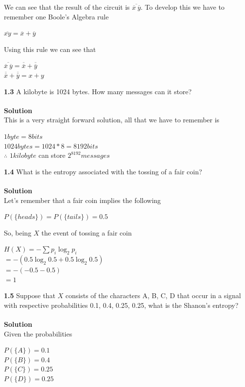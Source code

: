 \documentclass{article}
\begin{document}
We can see that the result of the circuit is $\overline{\overline{x} \ \overline{y}}$. To develop this we have to remember one Boole's Algebra rule
\begin{center}
$\overline{xy} = \overline{x} + \overline{y}$
\end{center}
Using this rule we can see that \\
\begin{center}
$\overline{\overline{x} \ \overline{y}} = \overline{\overline{x}} + \overline{\overline{y}}$\\
$\overline{\overline{x}} + \overline{\overline{y}} = x + y$
\end{center}
\textbf{1.3} A kilobyte is 1024 bytes. How many messages can it store?\\ \\
\textbf{Solution}\\
This is a very straight forward solution, all that we have to remember is\\
\begin{center}
$1 byte = 8 bits$\\
$1024 bytes= 1024 * 8 = 8192 bits$\\
$\therefore{}$ $1 kilobyte$ can store $2^{8192} messages$
\end{center}
\textbf{1.4} What is the entropy associated with the tossing of a fair coin?\\ \\
\textbf{Solution}\\
Let's remember that a fair coin implies the following\\
\begin{center}
$P(\{heads\}) = P(\{tails\}) = 0.5$
\end{center}
So, being $X$ the event of tossing a fair coin\\
\begin{center}
$H(X) = -\sum p_i \log_2 p_i$\\
$= -(0.5 \log_2 0.5 + 0.5 \log_2 0.5)$\\
$= -(-0.5 - 0.5)$\\
$=1$
\end{center}
\textbf{1.5} Suppose that $X$ consists of the characters A, B, C, D that occur in a signal with respective probabilities 0.1, 0.4, 0.25, 0.25, what is  the Shanon's entropy?\\ \\
\textbf{Solution}\\
Given the probabilities \\
\begin{center}
$P(\{A\}) = 0.1$\\
$P(\{B\}) = 0.4$\\
$P(\{C\}) = 0.25$\\
$P(\{D\}) = 0.25$\\
\end{center}
\end{document}
